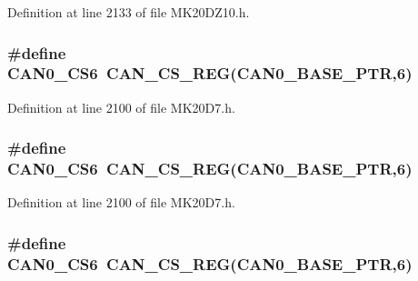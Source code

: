 Definition at line 2133 of file M\+K20\+D\+Z10.\+h.

\subsubsection[{\texorpdfstring{C\+A\+N0\+\_\+\+C\+S6}{CAN0_CS6}}]{\setlength{\rightskip}{0pt plus 5cm}\#define C\+A\+N0\+\_\+\+C\+S6~{\bf C\+A\+N\+\_\+\+C\+S\+\_\+\+R\+EG}({\bf C\+A\+N0\+\_\+\+B\+A\+S\+E\+\_\+\+P\+TR},6)}\hypertarget{group___c_a_n___register___accessor___macros_ga32b1b1c837368b66fa63f2ba418c1203}{}\label{group___c_a_n___register___accessor___macros_ga32b1b1c837368b66fa63f2ba418c1203}


Definition at line 2100 of file M\+K20\+D7.\+h.

\subsubsection[{\texorpdfstring{C\+A\+N0\+\_\+\+C\+S6}{CAN0_CS6}}]{\setlength{\rightskip}{0pt plus 5cm}\#define C\+A\+N0\+\_\+\+C\+S6~{\bf C\+A\+N\+\_\+\+C\+S\+\_\+\+R\+EG}({\bf C\+A\+N0\+\_\+\+B\+A\+S\+E\+\_\+\+P\+TR},6)}\hypertarget{group___c_a_n___register___accessor___macros_ga32b1b1c837368b66fa63f2ba418c1203}{}\label{group___c_a_n___register___accessor___macros_ga32b1b1c837368b66fa63f2ba418c1203}


Definition at line 2100 of file M\+K20\+D7.\+h.

\subsubsection[{\texorpdfstring{C\+A\+N0\+\_\+\+C\+S6}{CAN0_CS6}}]{\setlength{\rightskip}{0pt plus 5cm}\#define C\+A\+N0\+\_\+\+C\+S6~{\bf C\+A\+N\+\_\+\+C\+S\+\_\+\+R\+EG}({\bf C\+A\+N0\+\_\+\+B\+A\+S\+E\+\_\+\+P\+TR},6)}\hypertarget{group___c_a_n___register___accessor___macros_ga32b1b1c837368b66fa63f2ba418c1203}{}\label{group___c_a_n___register___accessor___macros_ga32b1b1c837368b66fa63f2ba418c1203}


